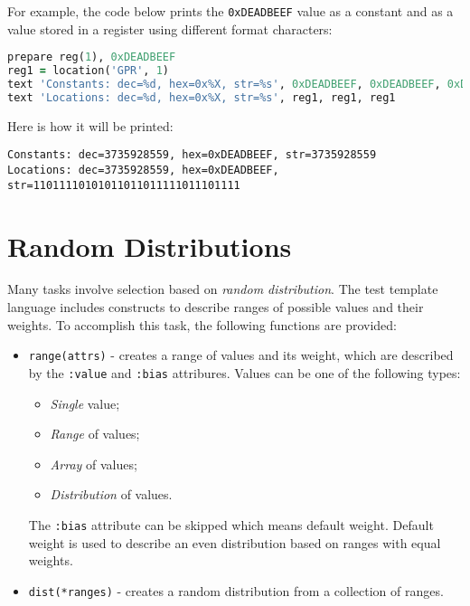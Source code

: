 \documentclass[oneside,final,12pt]{extreport}
\begin{document}
For example, the code below prints the \texttt{0xDEADBEEF} value as a constant and as
a value stored in a register using different format characters:

\begin{lstlisting}[language=ruby]
prepare reg(1), 0xDEADBEEF
reg1 = location('GPR', 1)
text 'Constants: dec=%d, hex=0x%X, str=%s', 0xDEADBEEF, 0xDEADBEEF, 0xDEADBEEF
text 'Locations: dec=%d, hex=0x%X, str=%s', reg1, reg1, reg1
\end{lstlisting}

Here is how it will be printed:

\begin{lstlisting}
Constants: dec=3735928559, hex=0xDEADBEEF, str=3735928559
Locations: dec=3735928559, hex=0xDEADBEEF, str=11011110101011011011111011101111
\end{lstlisting}


\section{Random Distributions}
\label{Random_Distributions}

Many tasks involve selection based on \emph{random distribution}. The test template
language includes constructs to describe ranges of possible values and their weights.
To accomplish this task, the following functions are provided:

\begin{itemize}
\item \texttt{range(attrs)} - creates a range of values and its weight, which are 
      described by the \texttt{:value} and \texttt{:bias} attribures. Values can be
      one of the following types:

      \begin{itemize}
      \item \emph{Single} value;
      \item \emph{Range} of values;
      \item \emph{Array} of values;
      \item \emph{Distribution} of values.
      \end{itemize}

      The \texttt{:bias} attribute can be skipped which means default weight. Default weight
      is used to describe an even distribution based on ranges with equal weights.

\item \texttt{dist(*ranges)} - creates a random distribution from a collection of
       ranges.
\end{itemize}
\end{document}
